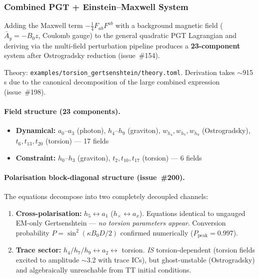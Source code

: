 \subsubsection{Combined PGT + Einstein--Maxwell System}
\label{sec:torsion-em-combined}

Adding the Maxwell term $-\tfrac{1}{4}F_{ab}F^{ab}$ with a background magnetic
field ($\bar{A}_y = -B_0 z$, Coulomb gauge) to the general quadratic PGT
Lagrangian and deriving via the multi-field perturbation pipeline produces a
\textbf{23-component} system after Ostrogradsky reduction (issue~\#154).

Theory: \texttt{examples/torsion\_gertsenshtein/theory.toml}.  Derivation takes
$\sim$915\,s due to the canonical decomposition of the large combined expression
(issue~\#198).

\paragraph{Field structure (23 components).}
\begin{itemize}
  \item \textbf{Dynamical:} $a_0$--$a_3$ (photon), $h_4$--$h_9$ (graviton),
    $w_{h_4}, w_{h_7}, w_{h_9}$ (Ostrogradsky), $t_6, t_{13}, t_{20}$ (torsion)
    --- 17 fields
  \item \textbf{Constraint:} $h_0$--$h_3$ (graviton), $t_2, t_{10}, t_{17}$
    (torsion) --- 6 fields
\end{itemize}

\paragraph{Polarisation block-diagonal structure (issue~\#200).}
The equations decompose into two completely decoupled channels:
\begin{enumerate}
  \item \textbf{Cross-polarisation:} $h_5 \leftrightarrow a_1$ ($h_\times
    \leftrightarrow a_x$).  Equations identical to ungauged EM-only
    Gertsenshtein --- \emph{no torsion parameters appear}.  Conversion
    probability $P = \sin^2(\kappa B_0 D/2)$ confirmed numerically
    ($P_\mathrm{peak} = 0.997$).
  \item \textbf{Trace sector:} $h_4/h_7/h_9 \leftrightarrow a_2
    \leftrightarrow$ torsion.  \emph{IS} torsion-dependent (torsion fields
    excited to amplitude $\sim$3.2 with trace ICs), but ghost-unstable
    (Ostrogradsky) and algebraically unreachable from TT initial conditions.
\end{enumerate}

